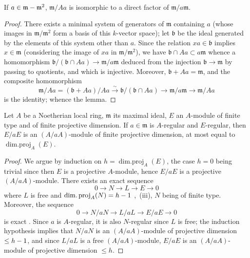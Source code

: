 \begin{lemma}[17.3.1.3]
\label{0.17.3.1.3}
If $a\in\mathfrak{m}-\mathfrak{m}^2$, $\mathfrak{m}/Aa$ is isomorphic to a direct factor of $\mathfrak{m}/a\mathfrak{m}$.
\end{lemma}

\begin{proof}
There exists a minimal system of generators of $\mathfrak{m}$ containing $a$ (whose images in $\mathfrak{m}/\mathfrak{m}^2$ form a basis of this $k$-vector space);
let $\mathfrak{b}$ be the ideal generated by the elements of this system other than $a$.
Since the relation $xa\in\mathfrak{b}$ implies $x\in\mathfrak{m}$ (considering the image of $xa$ in $\mathfrak{m}/\mathfrak{m}^2$), we have $\mathfrak{b}\cap Aa\subset a\mathfrak{m}$ whence a homomorphism $\mathfrak{b}/(\mathfrak{b}\cap Aa)\to\mathfrak{m}/a\mathfrak{m}$ deduced from the injection $\mathfrak{b}\to\mathfrak{m}$ by passing to quotients, and which is injective.
Moreover, $\mathfrak{b}+Aa=\mathfrak{m}$, and the composite homomorphism
\[
  \mathfrak{m}/Aa=(\mathfrak{b}+Aa)/Aa\xrightarrow{\sim}\mathfrak{b}/(\mathfrak{b}\cap Aa)\to\mathfrak{m}/a\mathfrak{m}\to\mathfrak{m}/Aa
\]
is the identity; whence the lemma.
\end{proof}

\begin{lemma}[17.3.1.4]
\label{0.17.3.1.4}
Let $A$ be a Noetherian local ring, $\mathfrak{m}$ its maximal ideal, $E$ an $A$-module of finite type and of finite projective dimension.
If $a\in\mathfrak{m}$ is $A$-regular and $E$-regular, then $E/aE$ is an $(A/aA)$-module of finite projective dimension, at most equal to $\operatorname{dim.proj}_A(E)$.
\end{lemma}

\begin{proof}
We argue by induction on $h=\operatorname{dim.proj}_A(E)$, the case $h=0$ being trivial since then $E$ is a projective $A$-module, hence $E/aE$ is a projective $(A/aA)$-module.
There exists an exact sequence
\[
  0\to N\to L\to E\to 0
\]
where $L$ is free and $\operatorname{dim.proj}_A(N)=h- 1$ ,~(iii), $N$ being of finite type.
Moreover, the sequence
\[
  0\to N/aN\to L/aL\to E/aE\to 0
\]
is exact .
Since $a$ is $A$-regular, it is also $N$-regular since $L$ is free;
the induction hypothesis implies that $N/aN$ is an $(A/aA)$-module of projective dimension $\leq h- 1$, and since $L/aL$ is a free $(A/aA)$-module, $E/aE$ is an $(A/aA)$-module of projective dimension $\leq h$.
\end{proof}

